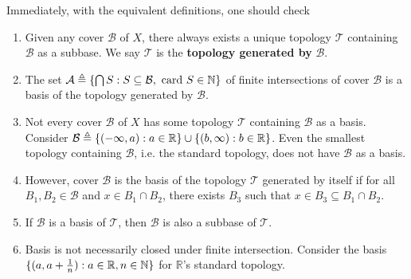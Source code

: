 \documentclass{report}
\begin{document}
\begin{mdframed}
Immediately, with the equivalent definitions, one should check
\begin{enumerate}[label=(\alph*)]
    \item Given any cover $\mathcal{B}$ of $X$, there always exists a unique topology $\mathscr{T}$ containing $\mathcal{B}$ as a subbase. We say $\mathscr{T}$ is the \textbf{topology generated by} $\mathcal{B}$.
    \item The set $\mathcal{A} \triangleq \{  \bigcap S : S \subseteq \mathcal{B}, \text{ card }S \in \mathbb{N}  \}$ of finite intersections of cover $\mathcal{B}$ is a basis of the topology generated by $\mathcal{B}$.
    \item Not every cover $\mathcal{B}$ of $X$ has some topology $\mathscr{T}$ containing $\mathcal{B}$ as a basis. Consider $\mathcal{B} \triangleq \{  (-\infty, a) : a \in \mathbb{R}  \} \cup \{  (b, \infty) : b \in \mathbb{R}  \}$. Even the smallest topology containing $\mathcal{B}$, i.e. the standard topology, does not have $\mathcal{B}$ as a basis.
    \item However, cover $\mathcal{B}$ is the basis of the topology $\mathscr{T}$ generated by itself if for all $B_1, B_2 \in \mathcal{B}$ and $x \in B_1 \cap B_2$, there exists $B_3$ such that $x \in B_3 \subseteq B_1 \cap B_2$.
    \item If $\mathcal{B}$ is a basis of $\mathscr{T}$, then $\mathcal{B}$ is also a subbase of $\mathscr{T}$.
    \item Basis is not necessarily closed under finite intersection. Consider the basis $\{ (a, a + \frac{1}{n}) : a \in \mathbb{R}, n \in \mathbb{N} \}$ for $\mathbb{R}$'s standard topology.
\end{enumerate}


\end{mdframed}
\end{document}
